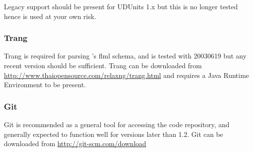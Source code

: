 Legacy support should be present for UDUnits 1.x but this is no longer tested
hence is used at your own risk.

\subsubsection{Trang}
\label{sec:required_libraries_supporting_trang}

Trang is required for parsing \fluidity's flml schema, and is tested with
20030619 but any recent version should be sufficient. Trang can be downloaded
from \url{http://www.thaiopensource.com/relaxng/trang.html} and requires a
Java Runtime Environment to be present.

\subsubsection{Git}
\label{sec:required_libraries_supporting_git}

Git is recommended as a general tool for accessing the \fluidity code
repository, and generally expected to function well for versions later than
1.2. Git can be downloaded from \url{http://git-scm.com/download}
